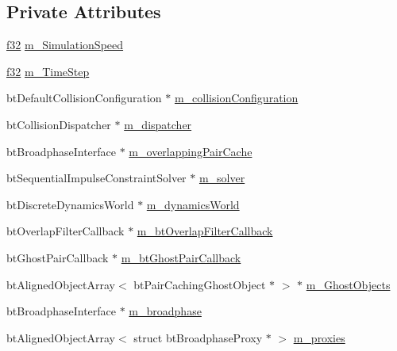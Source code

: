 \subsection*{Private Attributes}
\begin{DoxyCompactItemize}
\item 
\mbox{\hyperlink{_util_8h_a5f6906312a689f27d70e9d086649d3fd}{f32}} \mbox{\hyperlink{classnjli_1_1_physics_world_a54627e3b1f1e890d5c9247e00f9f002e}{m\+\_\+\+Simulation\+Speed}}
\item 
\mbox{\hyperlink{_util_8h_a5f6906312a689f27d70e9d086649d3fd}{f32}} \mbox{\hyperlink{classnjli_1_1_physics_world_a126ce6c1394f120b6b325a175ed1f21f}{m\+\_\+\+Time\+Step}}
\item 
bt\+Default\+Collision\+Configuration $\ast$ \mbox{\hyperlink{classnjli_1_1_physics_world_aafdda2fa604a317def17d80f314ffa4c}{m\+\_\+collision\+Configuration}}
\item 
bt\+Collision\+Dispatcher $\ast$ \mbox{\hyperlink{classnjli_1_1_physics_world_ace80c5e179eb0c715b681b674812c50b}{m\+\_\+dispatcher}}
\item 
bt\+Broadphase\+Interface $\ast$ \mbox{\hyperlink{classnjli_1_1_physics_world_a9196ae1dcdf7af4f556bc7f0ee0f7e37}{m\+\_\+overlapping\+Pair\+Cache}}
\item 
bt\+Sequential\+Impulse\+Constraint\+Solver $\ast$ \mbox{\hyperlink{classnjli_1_1_physics_world_a89f04597ef21e57dd83b634062343822}{m\+\_\+solver}}
\item 
bt\+Discrete\+Dynamics\+World $\ast$ \mbox{\hyperlink{classnjli_1_1_physics_world_ac56a66cca1fd4605a7120901be9617a3}{m\+\_\+dynamics\+World}}
\item 
bt\+Overlap\+Filter\+Callback $\ast$ \mbox{\hyperlink{classnjli_1_1_physics_world_ada03017b6b1b08439170bbefa348d787}{m\+\_\+bt\+Overlap\+Filter\+Callback}}
\item 
bt\+Ghost\+Pair\+Callback $\ast$ \mbox{\hyperlink{classnjli_1_1_physics_world_afcd5c37a467fc854fe78ef3a0093c970}{m\+\_\+bt\+Ghost\+Pair\+Callback}}
\item 
bt\+Aligned\+Object\+Array$<$ bt\+Pair\+Caching\+Ghost\+Object $\ast$ $>$ $\ast$ \mbox{\hyperlink{classnjli_1_1_physics_world_aee336d653cf084185323fcd280daf9ef}{m\+\_\+\+Ghost\+Objects}}
\item 
bt\+Broadphase\+Interface $\ast$ \mbox{\hyperlink{classnjli_1_1_physics_world_a595d7dd5dd9497891b369aecf2ad3553}{m\+\_\+broadphase}}
\item 
bt\+Aligned\+Object\+Array$<$ struct bt\+Broadphase\+Proxy $\ast$ $>$ \mbox{\hyperlink{classnjli_1_1_physics_world_a068f9b23b65b403bec6743ee123a6a39}{m\+\_\+proxies}}

\end{DoxyCompactItemize}

